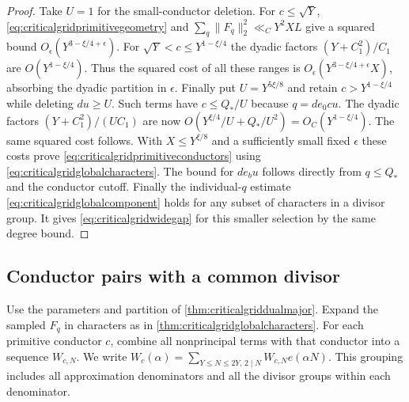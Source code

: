 \documentclass[11pt,a4paper]{article}
\numberwithin{equation}{section}
\begin{document}
\begin{proof}
Take $U=1$ for the small-conductor deletion.
For $c\le\sqrt Y$, \cref{eq:criticalgridprimitivegeometry}
and $\sum_q\|F_q\|_2^2\ll_C Y^2XL$ give a squared bound
$O_\epsilon(Y^{3-\xi/4+\epsilon})$.
For $\sqrt Y<c\le Y^{1-\xi/4}$ the dyadic factors
$(Y+C_1^2)/C_1$ are $O(Y^{1-\xi/4})$.
Thus the squared cost of all these ranges is
$O_\epsilon(Y^{3-\xi/4+\epsilon}X)$, absorbing the
dyadic partition in $\epsilon$.
Finally put $U=Y^{5\xi/8}$ and retain $c>Y^{1-\xi/4}$
while deleting $du\ge U$. Such terms have $c\le Q_*/U$
because $q=d e_0 c u$. The dyadic factors
$(Y+C_1^2)/(U C_1)$ are now
$O(Y^{\xi/4}/U+Q_*/U^2)=O_C(Y^{1-\xi/4})$.
The same squared cost follows.
With $X\le Y^{\xi/8}$ and a sufficiently small fixed
$\epsilon$ these costs prove
\cref{eq:criticalgridprimitiveconductors} using
\cref{eq:criticalgridglobalcharacters}. The bound for
$d e_b u$ follows directly from $q\le Q_*$ and the
conductor cutoff. Finally the individual-$q$ estimate
\cref{eq:criticalgridglobalcomponent} holds for any
subset of characters in a divisor group. It gives
\cref{eq:criticalgridwidegap} for this smaller selection
by the same degree bound.
\end{proof}

\clearpage
\subsection{Conductor pairs with a common divisor}

Use the parameters and partition of \cref{thm:criticalgriddualmajor}.
Expand the sampled $F_q$ in characters as in
\cref{thm:criticalgridglobalcharacters}. For each primitive
conductor $c$, combine all nonprincipal terms with that
conductor into a sequence $W_{c,N}$. We write
$W_c(\alpha)=\sum_{Y\le N\le2Y,\,2\mid N}W_{c,N}e(\alpha N)$.
This grouping includes all approximation denominators and all
the divisor groups within each denominator.
\end{document}
